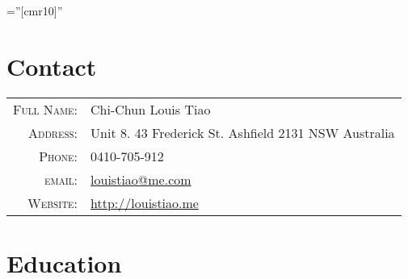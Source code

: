 \documentclass[a4paper,10pt]{article} %
\begin{document}
\pagestyle{empty} %

\font\fb=''[cmr10]'' %


\par{\bigskip\par} %

\section{Contact}

\begin{tabular}{rl}
\textsc{Full Name:} & Chi-Chun Louis Tiao\\
\textsc{Address:} & Unit 8. 43 Frederick St. Ashfield 2131 NSW Australia \\
\textsc{Phone:} & 0410-705-912 \\
\textsc{email:} & \href{mailto:louistiao@me.com}
  {louistiao@me.com} \\
\textsc{Website:} & \href{http://louistiao.me}
  {http://louistiao.me} 
\end{tabular}


\section{Education}
\end{document}
